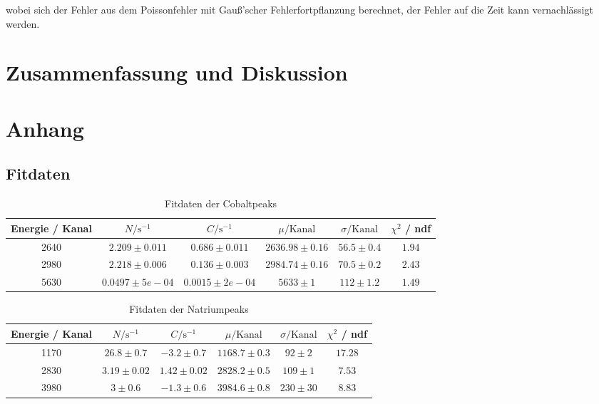\documentclass[12pt,listof=totoc]{scrartcl}
\begin{document}
wobei sich der Fehler aus dem Poissonfehler mit Gauß'scher Fehlerfortpflanzung berechnet, der Fehler auf die Zeit kann vernachlässigt werden.



\newpage
\section{Zusammenfassung und Diskussion \label{Diskussion}}


\newpage
\section{Anhang}
\subsection{Fitdaten}

\begin{table}[h!]
	\footnotesize\centering
	\begin{tabular}{|c||c|c|c|c||c|}
		\hline
		Energie / Kanal&$N/\mathrm{s^{-1}}$&$C/\mathrm{s^{-1}}$&$\mu/\mathrm{Kanal}$&$\sigma/\mathrm{Kanal}$&$\chi^2$ / ndf\\\hline\hline2640&$2.209\pm0.011$&$0.686\pm0.011$&$2636.98\pm0.16$&$56.5\pm0.4$&$1.94$\\
		2980&$2.218\pm0.006$&$0.136\pm0.003$&$2984.74\pm0.16$&$70.5\pm0.2$&$2.43$\\
		5630&$0.0497\pm5e-04$&$0.0015\pm2e-04$&$5633\pm1$&$112\pm1.2$&$1.49$\\
		\hline\end{tabular}
	\caption{Fitdaten der Cobaltpeaks\label{cobalttable}}
\end{table}


\begin{table}[h!]
	\footnotesize\centering
	\begin{tabular}{|c||c|c|c|c||c|}
		\hline
		Energie / Kanal&$N/\mathrm{s^{-1}}$&$C/\mathrm{s^{-1}}$&$\mu/\mathrm{Kanal}$&$\sigma/\mathrm{Kanal}$&$\chi^2$ / ndf\\\hline\hline1170&$26.8\pm0.7$&$-3.2\pm0.7$&$1168.7\pm0.3$&$92\pm2$&$17.28$\\
		2830&$3.19\pm0.02$&$1.42\pm0.02$&$2828.2\pm0.5$&$109\pm1$&$7.53$\\
		3980&$3\pm0.6$&$-1.3\pm0.6$&$3984.6\pm0.8$&$230\pm30$&$8.83$\\
		\hline\end{tabular}
	\caption{Fitdaten der Natriumpeaks\label{natriumtable}}
\end{table}
\end{document}
